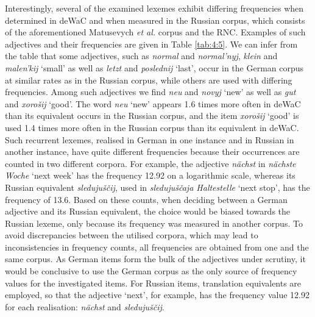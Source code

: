 Interestingly, several of the examined lexemes exhibit differing frequencies when determined in deWaC and when measured in the Russian corpus, which consists of the aforementioned Matusevych \textit{et al.} corpus and the RNC. Examples of such adjectives and their frequencies are given in Table \ref{tab:4:5}. We can infer from the table that some adjectives, such as \textit{normal} and \textit{normal'nyj}, \textit{klein} and \textit{malen'kij} `small' as well as \textit{letzt} and \textit{poslednij} `last', occur in the German corpus at similar rates as in the Russian corpus, while others are used with differing frequencies. Among such adjectives we find  \textit{neu} and \textit{novyj} `new' as well as \textit{gut} and \textit{xorošij} `good'. The word \textit{neu} `new' appears 1.6 times more often in deWaC than its equivalent occurs in the Russian corpus, and the item \textit{xorošij} `good' is used 1.4 times more often in the Russian corpus than its equivalent in deWaC. Such recurrent lexemes, realised in German in one instance and in Russian in another instance, have quite different frequencies because their occurrences are counted in two different corpora. For example, the adjective \textit{nächst} in \textit{nächste Woche} `next week' has the frequency 12.92 on a logarithmic scale, whereas its Russian equivalent \textit{sledujuščij}, used in \textit{sledujuščaja Haltestelle} `next stop', has the frequency of 13.6. Based on these counts, when deciding between a German adjective and its Russian equivalent, the choice would be biased towards the Russian lexeme, only because its frequency was measured in another corpus. To avoid discrepancies between the utilised corpora, which may lead to inconsistencies in frequency counts, all frequencies are obtained from one and the same corpus. As German items form the bulk of the adjectives under scrutiny, it would be conclusive to use the German corpus as the only source of frequency values for the investigated items. For Russian items, translation equivalents are employed, so that the adjective `next', for example, has the frequency value 12.92 for each realisation: \textit{nächst} and \textit{sledujuščij}.

